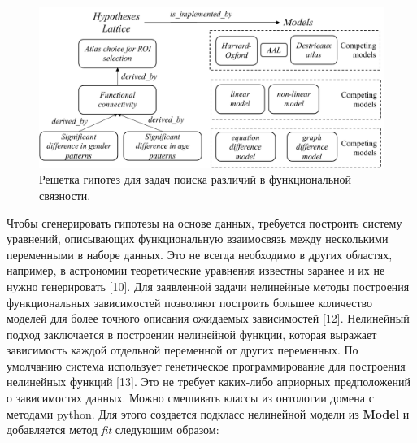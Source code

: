 \begin{figure}[ht]
    \centering
    \includegraphics[width=1.0\linewidth]{images/Hypothesis_Lattice.pdf}
    \caption{Решетка гипотез для задач поиска различий в функциональной связности.}\label{fig:Hypothesis_lattice}
\end{figure}

Чтобы сгенерировать гипотезы на основе данных, требуется построить систему уравнений, описывающих функциональную взаимосвязь между несколькими переменными в наборе данных. Это не всегда необходимо в других областях, например, в астрономии теоретические уравнения известны заранее и их не нужно генерировать [10].
Для заявленной задачи нелинейные методы построения функциональных зависимостей позволяют построить большее количество моделей для более точного описания ожидаемых зависимостей [12]. Нелинейный подход заключается в построении нелинейной функции, которая выражает зависимость каждой отдельной переменной от других переменных. По умолчанию система использует генетическое программирование для построения нелинейных функций [13]. Это не требует каких-либо априорных предположений о зависимостях данных. Можно смешивать классы из онтологии домена с методами python. Для этого создается подкласс нелинейной модели из \textbf{Model} и добавляется метод \textit{fit} следующим образом:

